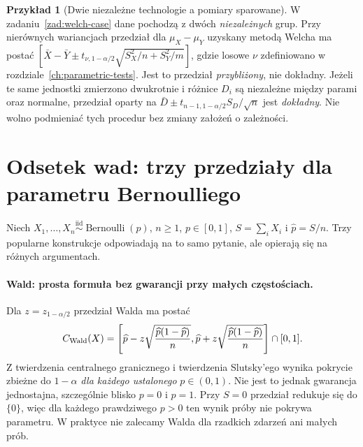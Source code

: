 \documentclass[11pt,a4paper,oneside]{report}
\numberwithin{equation}{chapter}
\theoremstyle{plain}
\theoremstyle{definition}
\newtheorem{przyklad}{Przykład}[chapter]
\theoremstyle{remark}
\newcommand{\iid}{\mathrel{\overset{\mathrm{iid}}\sim}}
\begin{document}
\begin{przyklad}[Dwie niezależne technologie a pomiary sparowane]
W zadaniu~\ref{zad:welch-case} dane pochodzą z dwóch
\emph{niezależnych} grup. Przy nierównych wariancjach
przedział dla $\mu_X-\mu_Y$ uzyskany metodą Welcha ma
postać
$[\bar X-\bar Y\pm t_{\nu,1-\alpha/2}
\sqrt{S_X^2/n+S_Y^2/m}]$, gdzie losowe $\nu$
zdefiniowano w rozdziale~\ref{ch:parametric-tests}.
Jest to przedział \emph{przybliżony}, nie dokładny.
Jeżeli te same jednostki zmierzono dwukrotnie i różnice
$D_i$ są niezależne między parami oraz normalne,
przedział oparty na $\bar D\pm t_{n-1,1-\alpha/2}S_D/\sqrt n$
jest \emph{dokładny}. Nie wolno podmieniać tych procedur
bez zmiany założeń o zależności.
\end{przyklad}

\section{Odsetek wad: trzy przedziały dla parametru Bernoulliego}
Niech $X_1,\ldots,X_n\iid\operatorname{Bernoulli}(p)$,
$n\ge1$, $p\in[0,1]$, $S=\sum_iX_i$ i
$\widehat p=S/n$. Trzy popularne konstrukcje odpowiadają
na to samo pytanie, ale opierają się na różnych argumentach.

\paragraph{Wald: prosta formuła bez gwarancji przy małych częstościach.}
Dla $z=z_{1-\alpha/2}$ przedział Walda ma postać
\[
 C_{\rm Wald}(X)=\left[\widehat p-z\sqrt{\frac{\widehat p(1-\widehat p)}n},
\widehat p+z\sqrt{\frac{\widehat p(1-\widehat p)}n}\right]
\cap[0,1].
\]
Z twierdzenia centralnego granicznego i twierdzenia Slutsky'ego
wynika pokrycie zbieżne do $1-\alpha$ \emph{dla każdego
ustalonego} $p\in(0,1)$. Nie jest to jednak gwarancja
jednostajna, szczególnie blisko $p=0$ i $p=1$.
Przy $S=0$ przedział redukuje się do $\{0\}$, więc dla
każdego prawdziwego $p>0$ ten wynik próby nie pokrywa
parametru. W praktyce nie zalecamy Walda dla rzadkich
zdarzeń ani małych prób.
\end{document}
